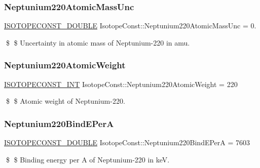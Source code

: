 \subsubsection{\texorpdfstring{Neptunium220\+Atomic\+Mass\+Unc}{Neptunium220AtomicMassUnc}}
{\footnotesize\ttfamily \mbox{\hyperlink{group___isotope_const-_macros_ga8f45a7272ce02c0b4c65c44636ed719a}{I\+S\+O\+T\+O\+P\+E\+C\+O\+N\+S\+T\+\_\+\+D\+O\+U\+B\+LE}} Isotope\+Const\+::\+Neptunium220\+Atomic\+Mass\+Unc = 0.}

\$ \$ Uncertainty in atomic mass of Neptunium-\/220 in amu. \mbox{\label{group___isotope_const-_neptunium-_np220_ga993f793c91baa059310f6b3e03ff1e15}} 
\subsubsection{\texorpdfstring{Neptunium220\+Atomic\+Weight}{Neptunium220AtomicWeight}}
{\footnotesize\ttfamily \mbox{\hyperlink{group___isotope_const-_macros_ga5f18360b3e99483a35c32d789e62621c}{I\+S\+O\+T\+O\+P\+E\+C\+O\+N\+S\+T\+\_\+\+I\+NT}} Isotope\+Const\+::\+Neptunium220\+Atomic\+Weight = 220}

\$ \$ Atomic weight of Neptunium-\/220. \mbox{\label{group___isotope_const-_neptunium-_np220_gace6250ccaabfb279caac027b546d905a}} 
\subsubsection{\texorpdfstring{Neptunium220\+Bind\+E\+PerA}{Neptunium220BindEPerA}}
{\footnotesize\ttfamily \mbox{\hyperlink{group___isotope_const-_macros_ga8f45a7272ce02c0b4c65c44636ed719a}{I\+S\+O\+T\+O\+P\+E\+C\+O\+N\+S\+T\+\_\+\+D\+O\+U\+B\+LE}} Isotope\+Const\+::\+Neptunium220\+Bind\+E\+PerA = 7603}

\$ \$ Binding energy per A of Neptunium-\/220 in keV. \mbox{\label{group___isotope_const-_neptunium-_np220_gab3c6639e42e31fb4978be36e629df24a}} 
